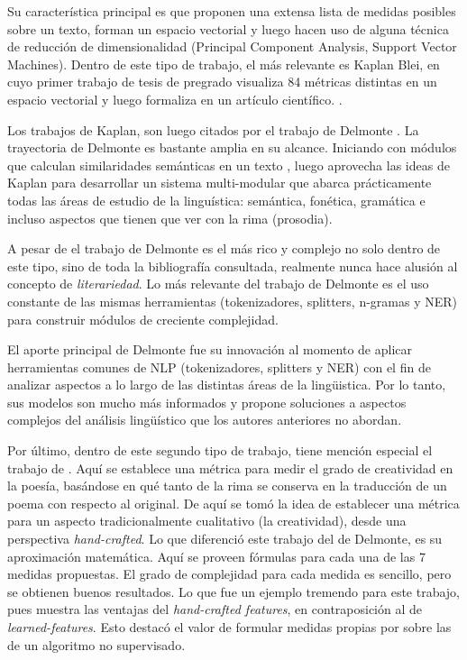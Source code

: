 \documentclass[12pt,letterpaper,twoside]{article}
\begin{document}
Su característica principal es que proponen una extensa lista de
medidas posibles sobre un texto, forman un espacio vectorial y luego
hacen uso de alguna técnica de reducción de dimensionalidad (Principal
Component Analysis, Support Vector Machines). Dentro de este tipo de
trabajo, el más relevante es Kaplan Blei, en cuyo primer trabajo
\cite{kaplan2006computational} de tesis de pregrado visualiza 84
métricas distintas en un espacio vectorial y luego formaliza en un
artículo científico. \cite{kaplan2007computational}.

Los trabajos de Kaplan, son luego citados por el trabajo de Delmonte
\cite{delmonte2013computing} \cite{delmonte2005venses}. La trayectoria
de Delmonte es bastante amplia en su alcance. Iniciando con módulos
que calculan similaridades semánticas en un texto \cite{delmonte2005venses},
luego aprovecha las ideas de Kaplan para desarrollar un sistema multi-modular
que abarca prácticamente todas las áreas de estudio de la linguística:
semántica, fonética, gramática e incluso aspectos que tienen que ver
con la rima (prosodia).

A pesar de el trabajo de Delmonte es el más rico y complejo no solo
dentro de este tipo, sino de toda la bibliografía consultada,
realmente nunca hace alusión al concepto de \emph{literariedad}. Lo más
relevante del trabajo de Delmonte es el uso constante de las mismas
herramientas (tokenizadores, splitters, n-gramas y NER) para construir
módulos de creciente complejidad. 


El aporte principal de Delmonte fue su innovación al momento de
aplicar herramientas comunes de NLP (tokenizadores, splitters y NER)
con el fin de analizar aspectos a lo largo de las distintas áreas de
la lingüistica. Por lo tanto, sus modelos son mucho más informados y
propone soluciones a aspectos complejos del análisis lingüístico que los
autores anteriores no abordan.

Por último, dentro de este segundo tipo de trabajo, tiene mención
especial el trabajo de \cite{zuniga2017automatic}. Aquí se establece
una métrica para medir el grado de creatividad en la poesía, basándose
en qué tanto de la rima se conserva en la traducción de un poema con
respecto al original. De aquí se tomó la idea de establecer una
métrica para un aspecto tradicionalmente cualitativo (la creatividad),
desde una perspectiva \emph{hand-crafted}. Lo que diferenció este trabajo
del de Delmonte, es su aproximación matemática. Aquí se proveen
fórmulas para cada una de las 7 medidas propuestas. El grado de
complejidad para cada medida es sencillo, pero se obtienen buenos
resultados.  Lo que fue un ejemplo tremendo para este trabajo, pues
muestra las ventajas del \emph{hand-crafted features}, en contraposición al
de \emph{learned-features}. Esto destacó el valor de formular medidas
propias por sobre las de un algoritmo no supervisado.
\end{document}
